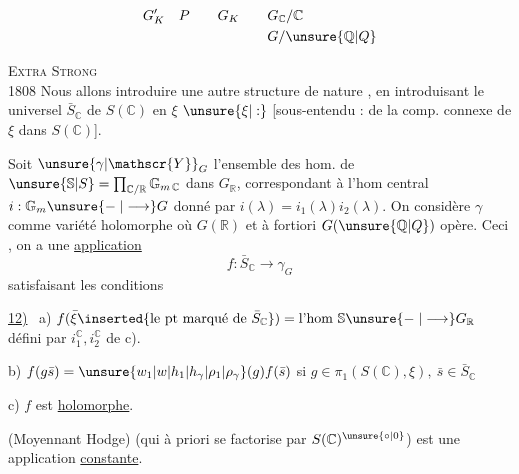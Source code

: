 \[
\begin{aligned}
G'_{K} \quad P \qquad G_{K} &\qquad G_{\mathbb{C}} / \mathbb{C} \\
                            &\qquad G / \unsure{\mathbb{Q}|Q}
\end{aligned}
\]


\noindent\textsc{Extra Strong}\\
 1808
Nous allons introduire une autre structure de nature , en introduisant le  universel $\bar S_{\mathbb C}$ de $S(\mathbb C)$ en $\xi$ $\unsure{\xi|:}$ [sous-entendu : de la comp. connexe de $\xi$ dans $S(\mathbb C)$].

Soit $\unsure{\gamma|\mathscr{Y}}_{G}$ l'ensemble des hom. de $\unsure{\mathbb S|S}=\prod_{\mathbb C/\mathbb R}\mathbb G_{m\,\mathbb C}$ dans $G_{\mathbb R}$, correspondant à l'hom central  $i:\mathbb G_m \unsure{\relbar|\longrightarrow} G$ donné par $i(\lambda)=i_1(\lambda)i_2(\lambda)$. \margin{\rule{0.35pt}{2.1\baselineskip}}On considère $\gamma$ comme variété  holomorphe où  $G(\mathbb R)$ et à fortiori $G(\unsure{\mathbb Q|Q})$ opère. Ceci , on a une \uline{application}
\[
\boxed{f:\bar S_{\mathbb C}\longrightarrow\gamma_G}
\]
satisfaisant les conditions

\uline{12)} \ a) $f(\bar\xi\inserted{\text{le pt marqué de }\bar S_{\mathbb C}})={}\text{l'hom }\mathbb S\unsure{\relbar|\longrightarrow} G_{\mathbb R}$ défini par $i_1^{\mathbb C},i_2^{\mathbb C}$ de c).

b) $f(g\bar s)=\unsure{w_{1}|w|h_{1}|h_{\gamma}|\rho_{1}|\rho_{\gamma}}(g)f(\bar s)$ si $g\in\pi_1(S(\mathbb C),\xi),\ \bar s\in\bar S_{\mathbb C}$

c) $f$ est \uline{holomorphe}.

 (Moyennant Hodge)   (qui à priori  se factorise par  $S(\mathbb C)^{\unsure{\circ|0}}$) est une application \uline{constante}.

